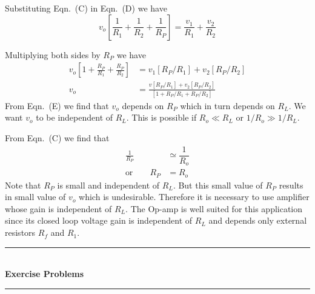 \begin{solution}
\vfill\eject

Substituting Eqn.~(C) in Eqn.~(D) we have
$$
v_{o}\left[\frac{1}{R_{1}}+\frac{1}{R_{2}}+\frac{1}{R_{P}}\right]=\frac{v_{1}}{R_{1}}+\frac{v_{2}}{R_{2}}
$$

Multiplying both sides by $R_{P}$ we have
\begin{align*}
v_{o}\left[1+\frac{R_{P}}{R_{1}}+\frac{R_{P}}{R_{2}}\right] &= v_{1}[R_{P}/R_{1}]+v_{2}[R_{P}/R_{2}]\\[3pt]
v_{o} &= \frac{v[R_{P}/R_{1}]+v_{2}[R_{P}/R_{2}]}{[1+R_{P}/R_{1}+R_{P}/R_{2}]}\tag{E}
\end{align*}
From Eqn.~(E) we find that $v_{o}$ depends on $R_{P}$ which in turn depends on $R_{L}$. We want $v_{o}$ to be independent of $R_{L}$. This is possible if $R_{o}\ll R_{L}$ or $1/R_{o}\gg 1/R_{L}$.

From Eqn.~(C) we find that
\begin{align*}
\frac{1}{R_{P}} & \simeq \dfrac{1}{R_{o}}\\[3pt]
\text{or}\qquad R_{P} &= R_{o}
\end{align*}
Note that $R_{P}$ is small and independent of $R_{L}$. But this small value of $R_{P}$ results in small value of $v_{o}$ which is undesirable. Therefore it is necessary to use amplifier whose gain is independent of $R_{L}$. The Op-amp is well suited for this application since its closed loop voltage gain is independent of $R_{L}$ and depends only external resistors $R_{f}$ and $R_{1}$.
\end{solution}


\smallskip
\begin{center}
\rule{5cm}{1pt}\\[-2pt]
{\bf Exercise Problems}\\[-4pt]
\rule{5cm}{1pt}
\end{center}

